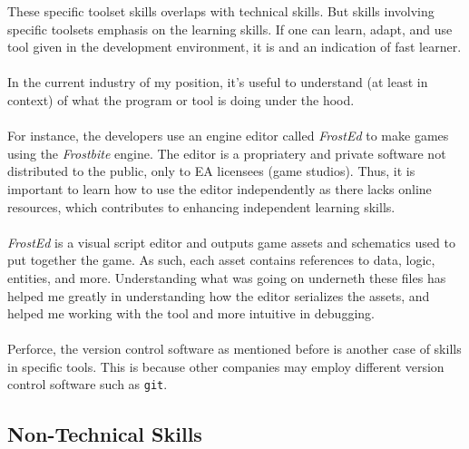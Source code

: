 \documentclass[10pt,letterpaper]{article}
\begin{document}
These specific toolset skills overlaps with technical skills. But skills involving specific toolsets emphasis on the learning skills. If one can learn, adapt, and use tool given in the development environment, it is and an indication of fast learner.\\
\\
In the current industry of my position, it's useful to understand (at least in context) of what the program or tool is doing under the hood.\\
\\
For instance, the developers use an engine editor called \textit{FrostEd} to make games using the \textit{Frostbite} engine. The editor is a propriatery and private software not distributed to the public, only to EA licensees (game studios). Thus, it is important to learn how to use the editor independently as there lacks online resources, which contributes to enhancing independent learning skills.\\
\\
\textit{FrostEd} is a visual script editor and outputs game assets and schematics used to put together the game. As such, each asset contains references to data, logic, entities, and more. Understanding what was going on underneth these files has helped me greatly in understanding how the editor serializes the assets, and helped me working with the tool and more intuitive in debugging.\\
\\
Perforce, the version control software as mentioned before is another case of skills in specific tools. This is because other companies may employ different version control software such as \texttt{git}.\\

\subsection{Non-Technical Skills}
\end{document}
